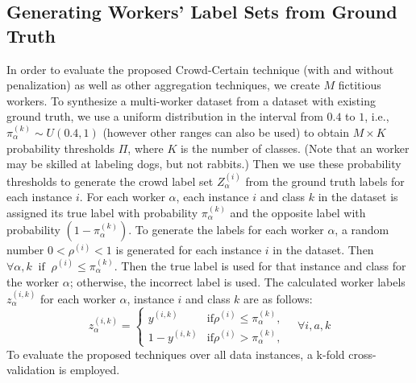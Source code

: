 \documentclass[default]{bst/sn-jnl_mine}%
\begin{document}
\subsection{Generating Workers' Label Sets from Ground Truth}\label{subsec:methods.generating_fictitious_labelset}
In order to evaluate the proposed Crowd-Certain technique (with and without penalization) as well as other aggregation techniques, we create $M$ fictitious workers. To synthesize a multi-worker dataset from a dataset with existing ground truth, we use a uniform distribution in the interval from $0.4 $ to $1 $, i.e., $\pi_\alpha^{(k)} \sim U\left(0.4,1\right) $ (however other ranges can also be used) to obtain $M \times  K$ probability thresholds $\Pi $, where $K$ is the number of classes. (Note that
an worker may be skilled at labeling dogs, but not rabbits.) Then we use these probability thresholds to generate the crowd label set $Z_{\alpha}^{(i)} $ from the ground truth labels for each instance $i $.
For each worker $\alpha $, each instance $i $ and class $k $ in the dataset is assigned its true label with probability $\pi_\alpha^{(k)}$ and the opposite label with probability $ (1-\pi_\alpha^{(k)})$. To generate the labels for each worker $\alpha $, a random number $0 < \rho^{(i)} < 1 $ is generated for each instance $i $ in the dataset. Then $\forall \alpha,k \; \; \text{if} \; \; \rho^{(i)}\leq \pi_\alpha^{(k)}$. Then the true label is used for that instance and class for the worker $\alpha $; otherwise, the incorrect label is used.
The calculated worker labels $z_{\alpha}^{(i,k)} $ for each worker $\alpha $, instance $i $ and class $k $ are as follows:
\begin{equation}
    z_{\alpha}^{(i,k)} =
    \begin{cases}
        y^{(i,k)} & \text{if} \rho^{(i)}  \leq \pi_\alpha^{(k)} , \\
        1 - y^{(i,k)} & \text{if} \rho^{(i)} > \pi_\alpha^{(k)} ,
    \end{cases} \quad \forall i, a, k
    \label{eq:crowd.Eq.4.fictitious_label}
\end{equation}
To evaluate the proposed techniques over all data instances, a k-fold cross-validation is employed.
\end{document}
